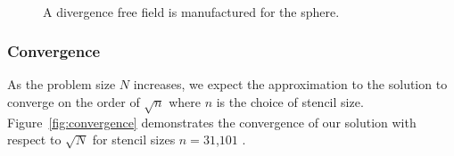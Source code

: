 \begin{figure} 
\centering
{} \\
\caption{A divergence free field is manufactured for the sphere. }
\label{fig:manufactured_solution}
\end{figure} 

\subsubsection{Convergence}

As the problem size $N$ increases, we expect the approximation to the solution to converge on the order of $\sqrt{n}$ where $n$ is the choice of stencil size. Figure~\ref{fig:convergence} demonstrates the convergence of our solution with respect to $\sqrt{N}$ for stencil sizes $n=31$,$101$ . 




